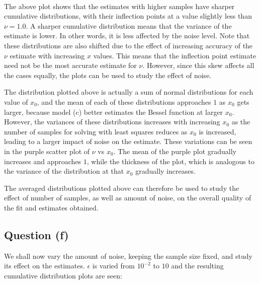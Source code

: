 \documentclass[11pt]{article}
\begin{document}
	

	

    \begin{center}
    \end{center}
    { \hspace*{\fill} \\}
    
	
		
    The above plot shows that the estimates with higher samples have sharper
cumulative distributions, with their inflection points at a value
slightly less than \(\nu = 1.0\). A sharper cumulative distribution
means that the variance of the estimate is lower. In other words, it is
less affected by the noise level. Note that these distributions are also
shifted due to the effect of increasing accuracy of the \(\nu\) estimate
with increasing \(x\) values. This means that the inflection point
estimate need not be the most accurate estimate for \(\nu\). However,
since this skew affects all the cases equally, the plots can be used to
study the effect of noise.

The distribution plotted above is actually a sum of normal distributions
for each value of \(x_0\), and the mean of each of these distributions
approaches \(1\) as \(x_0\) gets larger, because model (c) better
estimates the Bessel function at larger \(x_0\). However, the variances
of these distributions increases with increasing \(x_0\) as the number
of samples for solving with least squares reduces as \(x_0\) is
increased, leading to a larger impact of noise on the estimate. These
variations can be seen in the purple scatter plot of \(\nu\) vs \(x_0\).
The mean of the purple plot gradually increases and approaches \(1\),
while the thickness of the plot, which is analogous to the variance of
the distribution at that \(x_0\) gradually increases.

The averaged distributions plotted above can therefore be used to study
the effect of number of samples, as well as amount of noise, on the
overall quality of the fit and estimates obtained.

	

	
		
    \subsection{Question (f)}\label{question-f}

We shall now vary the amount of noise, keeping the sample size fixed,
and study its effect on the estimates. \(\epsilon\) is varied from
\(10^{-2}\) to \(10\) and the resulting cumulative distribution plots
are seen:
\end{document}
